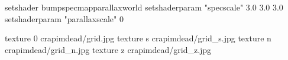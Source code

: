 setshader bumpspecmapparallaxworld
setshaderparam "specscale" 3.0 3.0 3.0
setshaderparam "parallaxscale" 0

texture 0 crapimdead/grid.jpg
texture s crapimdead/grid_s.jpg
texture n crapimdead/grid_n.jpg
texture z crapimdead/grid_z.jpg

